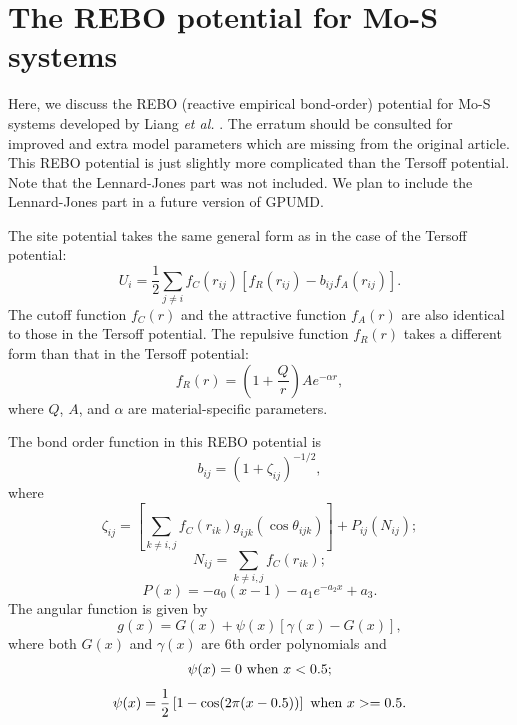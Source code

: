 \documentclass[12pt,a4paper]{report}
\begin{document}
\section{The REBO potential for Mo-S systems}

Here, we discuss the REBO (reactive empirical bond-order) potential for Mo-S systems developed by Liang \textit{et al.} \cite{liang2009prb}. The erratum \cite{liang2012prb_erratum} should be consulted for improved and extra model parameters which are missing from the original article. This REBO potential is just slightly more complicated than the Tersoff potential. Note that the Lennard-Jones part was not included. We plan to include the Lennard-Jones part in a future version of GPUMD. 


The site potential takes the same general form as in the case of the Tersoff potential:
\begin{equation}
U_i =  \frac{1}{2} \sum_{j \neq i} f_C(r_{ij}) \left[ f_R(r_{ij}) - b_{ij} f_A(r_{ij}) \right].
\end{equation}
The cutoff function $f_{C}(r)$ and the attractive function $f_{A}(r)$ are also identical to those in the Tersoff potential. The repulsive function $f_{R}(r)$ takes a different form than that in the Tersoff potential:
\begin{equation}
f_{R}(r) = \left(1+\frac{Q}{r}\right) A e^{-\alpha r},
\end{equation}
where $Q$, $A$, and $\alpha$ are material-specific parameters.

The bond order function in this REBO potential is
\begin{equation}
b_{ij} =\left(1 + \zeta_{ij}\right)^{-1/2},
\end{equation}
where
\begin{equation}
\zeta_{ij} = \left[ \sum_{k\neq i, j} f_C(r_{ik}) g_{ijk}(\cos\theta_{ijk}) \right] + P_{ij}(N_{ij});
\end{equation}
\begin{equation}
N_{ij} = \sum_{k\neq i,j} f_C(r_{ik});
\end{equation}
\begin{equation}
P(x) = -a_0(x-1) - a_1 e^{-a_2x}+a_3.
\end{equation}
The angular function  is given by
\begin{equation}
g(x)= G(x) + \psi(x) [ \gamma(x) - G(x)],
\end{equation}
where both $G(x)$ and $\gamma(x)$ are 6th order polynomials and
\begin{equation}
\psi(x)= 0 ~\textmd{when} ~x < 0.5;
\end{equation}
\begin{equation}
\psi(x)= \frac{1}{2} \left[ 1 - \cos(2\pi(x-0.5)) \right] ~ \textmd{when} ~x >= 0.5.
\end{equation}
\end{document}
